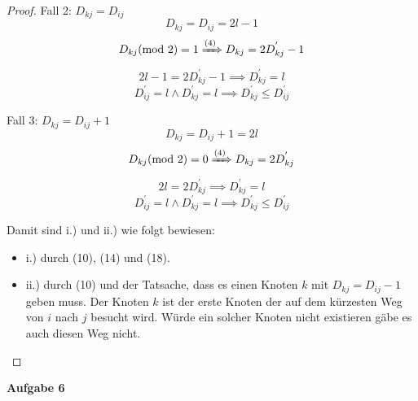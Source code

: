\documentclass{article}
\begin{document}
\begin{proof}
\noindent
Fall 2: $D_{kj} = D_{ij}$
\begin{equation}
  D_{kj} = D_{ij}=2l-1
\end{equation}
\begin{equation}
  D_{kj}(\text{mod } 2) = 1 \xRightarrow{(4)} D_{kj} = 2D^{'}_{kj} - 1
\end{equation}
\begin{equation}
  2l - 1 = 2D^{'}_{kj} - 1 \implies D^{'}_{kj} = l
\end{equation}
\begin{equation}
  D^{'}_{ij} = l \wedge D^{'}_{kj} = l \implies D^{'}_{kj} \leq D^{'}_{ij}
\end{equation}

\noindent
Fall 3: $D_{kj} = D_{ij} + 1$
\begin{equation}
  D_{kj} = D_{ij} + 1 = 2l
\end{equation}
\begin{equation}
  D_{kj}(\text{mod } 2) = 0 \xRightarrow{(4)} D_{kj} = 2D^{'}_{kj}
\end{equation}
\begin{equation}
  2l = 2D^{'}_{kj} \implies D^{'}_{kj} = l
\end{equation}
\begin{equation}
  D^{'}_{ij} = l \wedge D^{'}_{kj} = l \implies D^{'}_{kj} \leq D^{'}_{ij}
\end{equation}

\noindent
Damit sind i.) und ii.) wie folgt bewiesen:
\begin{itemize}
  \item[] i.) durch (10), (14) und (18).
  \item[] ii.) durch (10) und der Tatsache, dass es einen Knoten $k$ mit $D_{kj} = D_{ij} - 1$ geben muss. Der Knoten $k$ ist der erste Knoten der auf dem kürzesten Weg von $i$ nach $j$ besucht wird. Würde ein solcher Knoten nicht existieren gäbe es auch diesen Weg nicht.
\end{itemize}
\end{proof}

\newpage
{\noindent\bfseries Aufgabe 6}%
\medskip%
\end{document}
